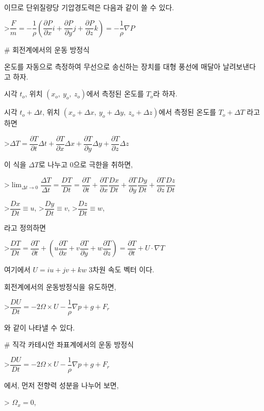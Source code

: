 이므로 단위질량당 기압경도력은 다음과 같이 쓸 수 있다.

>$ \dfrac {F}{m} = - \dfrac{1}{\rho} \left( \dfrac{\partial P}{\partial x} i + \dfrac{\partial P}{\partial y} j + \dfrac{\partial P}{\partial z} k \right) 
= - \dfrac{1}{\rho} \nabla P$ 

# 회전계에서의 운동 방정식

온도를 자동으로 측정하여 무선으로 송신하는 장치를 대형 풍선에 매달아 날려보낸다고 하자.

시각 $ t_{o}$, 위치 $(x_{o},~y_{o},~z_{o})$에서 측정된 온도를 $T_{o}$라 하자. 

시각 $ t_{o}+\Delta t$, 위치 $(x_{o}+\Delta x,~y_{o}+\Delta y,~z_{o}+\Delta z)$에서 측정된 온도를 $T_{o}+\Delta T$ 라고 하면

>$ \Delta T = \dfrac{\partial T}{\partial t} \Delta t 
+ \dfrac{\partial T}{\partial x} \Delta x 
+ \dfrac{\partial T}{\partial y} \Delta y 
+ \dfrac{\partial T}{\partial z} \Delta z $

이 식을 $ \Delta T $로 나누고 0으로 극한을 취하면,

>$ \displaystyle \lim_{\Delta t \rightarrow 0} \dfrac{\Delta T}{\Delta t} 
= \dfrac{DT}{Dt} = \dfrac{\partial T}{\partial t} 
+ \dfrac{\partial T}{\partial x} \dfrac{Dx}{Dt}
+ \dfrac{\partial T}{\partial y} \dfrac{Dy}{Dt}
+ \dfrac{\partial T}{\partial z} \dfrac{Dz}{Dt} $

>$\dfrac{Dx}{Dt} \equiv u$, 
>$\dfrac{Dy}{Dt} \equiv v$, 
>$\dfrac{Dz}{Dt} \equiv w$, 

라고 정의하면


>$ \dfrac{DT}{Dt} = \dfrac{\partial T}{\partial t} 
+ \left( u \dfrac{\partial T}{\partial x}
+ v \dfrac{\partial T}{\partial y}
+ w \dfrac{\partial T}{\partial z} \right)
= \dfrac{\partial T}{\partial t} + U \cdot \nabla T $

여기에서 $ U = iu + jv + kw $ 3차원 속도 벡터 이다.

회전계에서의 운동방정식을 유도하면,

>$ \dfrac{DU}{Dt} = -2 \Omega \times U - \dfrac{1}{\rho} \nabla p + g + F_{r} $

와 같이 나타낼 수 있다.



# 직각 카테시안 좌표계에서의 운동 방정식

>$ \dfrac{DU}{Dt} = -2 \Omega \times U - \dfrac{1}{\rho} \nabla p + g + F_{r} $ 

에서, 먼저 전향력 성분을 나누어 보면, 

> $ \Omega_{x} = 0$,

